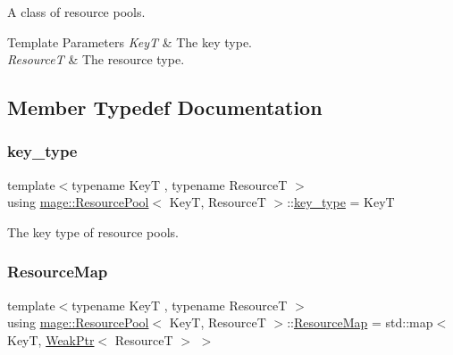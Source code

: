 A class of resource pools.


\begin{DoxyTemplParams}{Template Parameters}
{\em KeyT} & The key type. \\
\hline
{\em ResourceT} & The resource type. \\
\hline
\end{DoxyTemplParams}


\subsection{Member Typedef Documentation}
\hypertarget{classmage_1_1_resource_pool_adef3060db9bd6ffd8f46abd35afebae5}{}\label{classmage_1_1_resource_pool_adef3060db9bd6ffd8f46abd35afebae5} 
\subsubsection{\texorpdfstring{key\+\_\+type}{key\_type}}
{\footnotesize\ttfamily template$<$typename KeyT , typename ResourceT $>$ \\
using \hyperlink{classmage_1_1_resource_pool}{mage\+::\+Resource\+Pool}$<$ KeyT, ResourceT $>$\+::\hyperlink{classmage_1_1_resource_pool_adef3060db9bd6ffd8f46abd35afebae5}{key\+\_\+type} =  KeyT}

The key type of resource pools. \hypertarget{classmage_1_1_resource_pool_a7ae3cfa639bbc3696fa359673fed6153}{}\label{classmage_1_1_resource_pool_a7ae3cfa639bbc3696fa359673fed6153} 
\subsubsection{\texorpdfstring{Resource\+Map}{ResourceMap}}
{\footnotesize\ttfamily template$<$typename KeyT , typename ResourceT $>$ \\
using \hyperlink{classmage_1_1_resource_pool}{mage\+::\+Resource\+Pool}$<$ KeyT, ResourceT $>$\+::\hyperlink{classmage_1_1_resource_pool_a7ae3cfa639bbc3696fa359673fed6153}{Resource\+Map} =  std\+::map$<$ KeyT, \hyperlink{namespacemage_aa159a63c0d58464bdf32dfe419dd5dc1}{Weak\+Ptr}$<$ ResourceT $>$ $>$\hspace{0.3cm}{\ttfamily [private]}}

